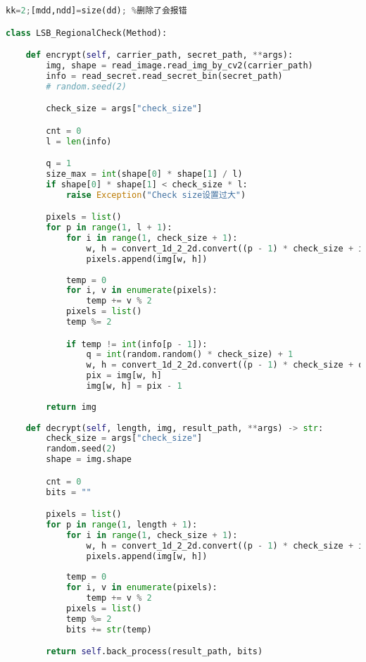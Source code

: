 \documentclass[a4paper,zihao=5,UTF8]{ctexart}
\begin{document}
\begin{lstlisting}[language=Python]%设置不同语言即可。
kk=2;[mdd,ndd]=size(dd); %删除了会报错

class LSB_RegionalCheck(Method):

    def encrypt(self, carrier_path, secret_path, **args):
        img, shape = read_image.read_img_by_cv2(carrier_path)
        info = read_secret.read_secret_bin(secret_path)
        # random.seed(2)

        check_size = args["check_size"]

        cnt = 0
        l = len(info)

        q = 1
        size_max = int(shape[0] * shape[1] / l)
        if shape[0] * shape[1] < check_size * l:
            raise Exception("Check size设置过大")

        pixels = list()
        for p in range(1, l + 1):
            for i in range(1, check_size + 1):
                w, h = convert_1d_2_2d.convert((p - 1) * check_size + i, shape[0])
                pixels.append(img[w, h])
            
            temp = 0
            for i, v in enumerate(pixels):
                temp += v % 2
            pixels = list()
            temp %= 2

            if temp != int(info[p - 1]):
                q = int(random.random() * check_size) + 1
                w, h = convert_1d_2_2d.convert((p - 1) * check_size + q, shape[0])
                pix = img[w, h]
                img[w, h] = pix - 1
        
        return img
    
    def decrypt(self, length, img, result_path, **args) -> str:
        check_size = args["check_size"]
        random.seed(2)
        shape = img.shape

        cnt = 0
        bits = ""

        pixels = list()
        for p in range(1, length + 1):
            for i in range(1, check_size + 1):
                w, h = convert_1d_2_2d.convert((p - 1) * check_size + i, img.shape[0])
                pixels.append(img[w, h])
            
            temp = 0
            for i, v in enumerate(pixels):
                temp += v % 2
            pixels = list()
            temp %= 2
            bits += str(temp)

        return self.back_process(result_path, bits)

\end{lstlisting}
\end{document}
